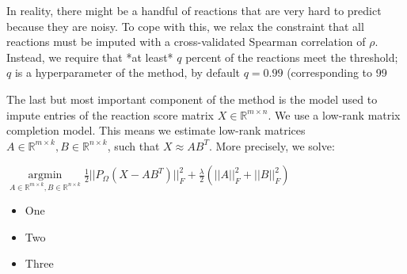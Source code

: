 \documentclass[12pt]{article}
\begin{document}
In reality, there might be a handful of reactions that are very hard to predict because they are noisy. To cope with this, we relax the constraint that all reactions must be imputed with a cross-validated Spearman correlation of $\rho$. Instead, we require that *at least* $q$ percent of the reactions meet the threshold; $q$ is a hyperparameter of the method, by default $q = 0.99$ (corresponding to 99%

The last but most important component of the method is the model used to impute entries of the reaction score matrix $X \in \mathbb{R}^{m \times n}$. We use a low-rank matrix completion model. This means we estimate low-rank matrices $A \in \mathbb{R}^{m \times k}, B \in \mathbb{R}^{n \times k}$, such that $X \approx AB^T$. More precisely, we solve:

$\mathop{\arg \min}\limits_{A \in \mathbb{R}^{m \times k}, B \in \mathbb{R}^{n \times k}} \frac{1}{2} ||P_\Omega(X - AB^T)||^2_F + \frac{\lambda}{2} (||A||^2_F + ||B||^2_F)$

\begin{itemize}

\item One

\item Two

\item Three

\end{itemize}
\end{document}
